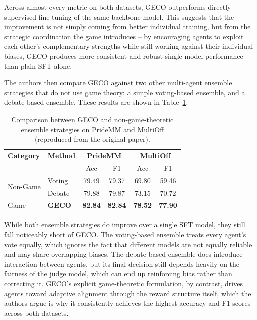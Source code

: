 \documentclass[manuscript,review]{acmart}
\begin{document}
Across almost every metric on both datasets, GECO outperforms directly supervised
fine-tuning of the same backbone model. This suggests that the improvement is not simply
coming from better individual training, but from the strategic coordination the game
introduces -- by encouraging agents to exploit each other's complementary strengths while
still working against their individual biases, GECO produces more consistent and robust
single-model performance than plain SFT alone.

The authors then compare GECO against two other multi-agent ensemble strategies that do
not use game theory: a simple voting-based ensemble, and a debate-based ensemble. These
results are shown in Table~\ref{tab:ensemble-comparison}.

\begin{table}[h]
\centering
\caption{Comparison between GECO and non-game-theoretic ensemble strategies on PrideMM and
MultiOff (reproduced from the original paper).}
\label{tab:ensemble-comparison}
\begin{tabular}{ll|cc|cc}
\toprule
\textbf{Category} & \textbf{Method} & \multicolumn{2}{c|}{\textbf{PrideMM}} & \multicolumn{2}{c}{\textbf{MultiOff}} \\
 & & Acc & F1 & Acc & F1 \\
\midrule
\multirow{2}{*}{Non-Game} & Voting & 79.49 & 79.37 & 69.80 & 59.46 \\
                          & Debate & 79.88 & 79.87 & 73.15 & 70.72 \\
\midrule
Game & \textbf{GECO} & \textbf{82.84} & \textbf{82.84} & \textbf{78.52} & \textbf{77.90} \\
\bottomrule
\end{tabular}
\end{table}

While both ensemble strategies do improve over a single SFT model, they still fall
noticeably short of GECO. The voting-based ensemble treats every agent's vote equally,
which ignores the fact that different models are not equally reliable and may share
overlapping biases. The debate-based ensemble does introduce interaction between agents,
but its final decision still depends heavily on the fairness of the judge model, which can
end up reinforcing bias rather than correcting it. GECO's explicit game-theoretic
formulation, by contrast, drives agents toward adaptive alignment through the reward
structure itself, which the authors argue is why it consistently achieves the highest
accuracy and F1 scores across both datasets.
\end{document}
